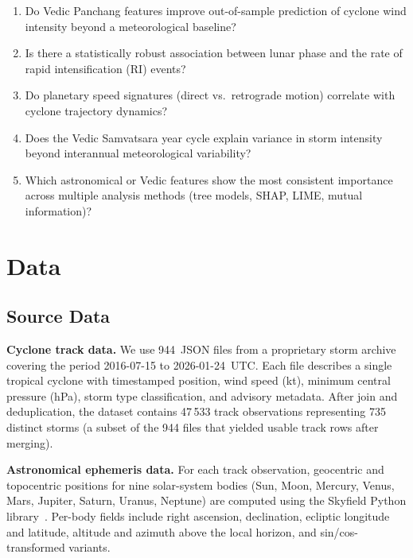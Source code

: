 \documentclass[12pt,a4paper]{article}
\begin{document}
\begin{enumerate}[label=\textbf{RQ\arabic*.}]
  \item Do Vedic Panchang features improve out-of-sample prediction of cyclone
        wind intensity beyond a meteorological baseline?
  \item Is there a statistically robust association between lunar phase and the
        rate of rapid intensification (RI) events?
  \item Do planetary speed signatures (direct vs.\ retrograde motion) correlate
        with cyclone trajectory dynamics?
  \item Does the Vedic Samvatsara year cycle explain variance in storm intensity
        beyond interannual meteorological variability?
  \item Which astronomical or Vedic features show the most consistent importance
        across multiple analysis methods (tree models, SHAP, LIME, mutual information)?
\end{enumerate}

\section{Data}

\subsection{Source Data}

\textbf{Cyclone track data.} We use 944~JSON files from a proprietary storm archive
covering the period 2016-07-15 to 2026-01-24~UTC. Each file describes a single
tropical cyclone with timestamped position, wind speed (kt), minimum central pressure
(hPa), storm type classification, and advisory metadata. After join and deduplication,
the dataset contains 47\,533 track observations representing 735 distinct storms
(a subset of the 944 files that yielded usable track rows after merging).

\textbf{Astronomical ephemeris data.} For each track observation, geocentric and
topocentric positions for nine solar-system bodies
(Sun, Moon, Mercury, Venus, Mars, Jupiter, Saturn, Uranus, Neptune) are computed
using the Skyfield Python library~\citep{skyfield2019}.
Per-body fields include right ascension, declination, ecliptic longitude and latitude,
altitude and azimuth above the local horizon, and sin/cos-transformed variants.
\end{document}

